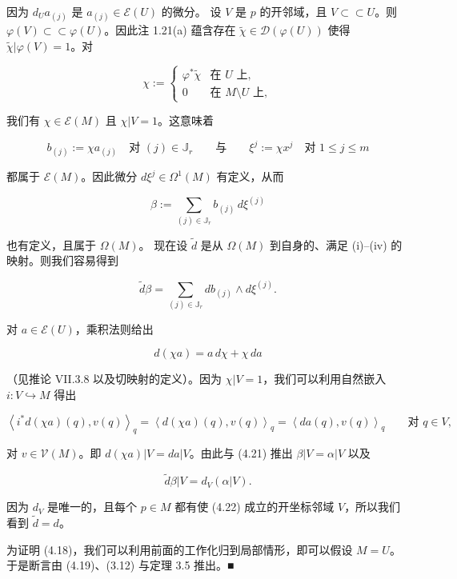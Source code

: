 \begin{theorem}
\begin{items}
因为 $ d_{U}a_{(j)} $ 是 $ a_{(j)}\in\mathcal{E}(U) $ 的微分。
设 $ V $ 是 $ p $ 的开邻域，且 $ V\subset\subset U $。则 $ \varphi(V)\subset\subset\varphi(U) $。因此注 1.21(a) 蕴含存在 $ \widetilde{\chi}\in\mathcal{D}(\varphi(U)) $ 使得 $ \widetilde{\chi}|\varphi(V) = 1 $。对

\begin{equation*}
\chi := \begin{cases} \varphi^{\ast}\widetilde{\chi} & \text{在 } U \text{ 上} , \\ 0 & \text{在 } M\setminus U \text{ 上} , \end{cases}
\end{equation*}

我们有 $ \chi\in\mathcal{E}(M) $ 且 $ \chi|V = 1 $。这意味着

\[
b_{(j)} := \chi a_{(j)} \quad \text{对 } (j)\in\mathbb{J}_{r} \qquad \text{与} \qquad \xi^{j} := \chi x^{j} \quad \text{对 } 1\le j\le m
\]

都属于 $ \mathcal{E}(M) $。因此微分 $ d\xi^{j}\in\Omega^{1}(M) $ 有定义，从而

\[
\beta := \sum_{(j)\in\mathbb{J}_{r}} b_{(j)}\,d\xi^{(j)}
\]

也有定义，且属于 $ \Omega(M) $。
现在设 $ \widetilde{d} $ 是从 $ \Omega(M) $ 到自身的、满足 (i)–(iv) 的映射。则我们容易得到

\[
\widetilde{d}\beta = \sum_{(j)\in\mathbb{J}_{r}} db_{(j)}\wedge d\xi^{(j)} .
\]

对 $ a\in\mathcal{E}(U) $，乘积法则给出

\[
d(\chi a) = a\,d\chi + \chi\,da
\]

（见推论 VII.3.8 以及切映射的定义）。因为 $ \chi|V = 1 $，我们可以利用自然嵌入 $ i: V\hookrightarrow M $ 得出

\[
\left\langle i^{\ast}d(\chi a)(q), v(q)\right\rangle_{q} = \left\langle d(\chi a)(q), v(q)\right\rangle_{q} = \left\langle da(q), v(q)\right\rangle_{q} \qquad \text{对 } q\in V ,
\]

对 $ v\in\mathcal{V}(M) $。即 $ d(\chi a)|V = da|V $。由此与 (4.21) 推出 $ \beta|V = \alpha|V $ 以及

\begin{equation}
\widetilde{d}\beta|V = d_{V}(\alpha|V) .\tag{4.22}
\end{equation}

因为 $ d_{V} $ 是唯一的，且每个 $ p\in M $ 都有使 (4.22) 成立的开坐标邻域 $ V $，所以我们看到 $ \widetilde{d} = d $。

\item[（c）]

为证明 (4.18)，我们可以利用前面的工作化归到局部情形，即可以假设 $ M = U $。于是断言由 (4.19)、(3.12) 与定理 3.5 推出。\nobreak\hspace{0.35em}■

\end{items}

\end{theorem}

